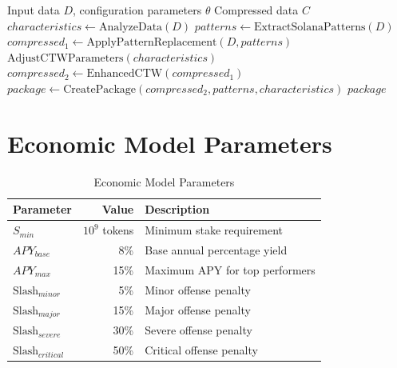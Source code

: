 \documentclass[11pt,a4paper]{article}
\begin{document}
\begin{algorithm}
\caption{PracticalMaxCompression Algorithm}
\begin{algorithmic}[1]
\REQUIRE Input data $D$, configuration parameters $\theta$
\ENSURE Compressed data $C$
\STATE $characteristics \leftarrow \text{AnalyzeData}(D)$
\STATE $patterns \leftarrow \text{ExtractSolanaPatterns}(D)$
\STATE $compressed_1 \leftarrow \text{ApplyPatternReplacement}(D, patterns)$
\STATE $\text{AdjustCTWParameters}(characteristics)$
\STATE $compressed_2 \leftarrow \text{EnhancedCTW}(compressed_1)$
\STATE $package \leftarrow \text{CreatePackage}(compressed_2, patterns, characteristics)$
\RETURN $package$
\end{algorithmic}
\end{algorithm}

\section{Economic Model Parameters}
\label{appendix:economics}

\begin{table}[H]
\centering
\caption{Economic Model Parameters}
\begin{tabular}{@{}lrl@{}}
\toprule
Parameter & Value & Description \\
\midrule
$S_{min}$ & $10^9$ tokens & Minimum stake requirement \\
$APY_{base}$ & 8\% & Base annual percentage yield \\
$APY_{max}$ & 15\% & Maximum APY for top performers \\
$\text{Slash}_{minor}$ & 5\% & Minor offense penalty \\
$\text{Slash}_{major}$ & 15\% & Major offense penalty \\
$\text{Slash}_{severe}$ & 30\% & Severe offense penalty \\
$\text{Slash}_{critical}$ & 50\% & Critical offense penalty \\
\bottomrule
\end{tabular}
\end{table}
\end{document}
